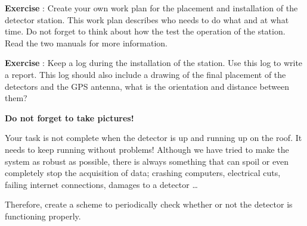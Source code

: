 \begin{shaded}
\textbf{Exercise \theExercise {}} : Create your own work plan for the placement and installation of the detector station. This work plan describes who needs to do what and at what time. Do not forget to think about how the test the operation of the station. Read the two manuals for more information.\end{shaded}

\begin{shaded}
\textbf{Exercise \theExercise {}} : Keep a log during the installation of the station. Use this log to write a report. This log should also include a drawing of the final placement of the detectors and the GPS antenna, what is the orientation and distance between them?

\textbf{Do not forget to take pictures!}\end{shaded}

Your task is not complete when the detector is up and running up on the roof. It needs to keep running without problems! Although we have tried to make the system as robust as possible, there is always something that can spoil or even completely stop the acquisition of data; crashing computers, electrical cuts, failing internet connections, damages to a detector \ldots 

Therefore, create a scheme to periodically check whether or not the detector is functioning properly.



